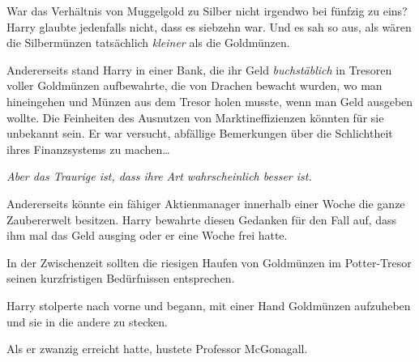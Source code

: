 War das Verhältnis von Muggelgold zu Silber nicht irgendwo bei fünfzig zu eins? Harry glaubte jedenfalls nicht, dass es siebzehn war. Und es sah so aus, als wären die Silbermünzen tatsächlich \emph{kleiner} als die Goldmünzen.

Andererseits stand Harry in einer Bank, die ihr Geld \emph{buchstäblich} in Tresoren voller Goldmünzen aufbewahrte, die von Drachen bewacht wurden, wo man hineingehen und Münzen aus dem Tresor holen musste, wenn man Geld ausgeben wollte. Die Feinheiten des Ausnutzen von Marktineffizienzen könnten für sie unbekannt sein. Er war versucht, abfällige Bemerkungen über die Schlichtheit ihres Finanzsystems zu machen…

\emph{Aber das Traurige ist, dass ihre Art wahrscheinlich besser ist.}

Andererseits könnte ein fähiger Aktienmanager innerhalb einer Woche die ganze Zaubererwelt besitzen. Harry bewahrte diesen Gedanken für den Fall auf, dass ihm mal das Geld ausging oder er eine Woche frei hatte.

In der Zwischenzeit sollten die riesigen Haufen von Goldmünzen im Potter-Tresor seinen kurzfristigen Bedürfnissen entsprechen.

Harry stolperte nach vorne und begann, mit einer Hand Goldmünzen aufzuheben und sie in die andere zu stecken.

Als er zwanzig erreicht hatte, hustete Professor McGonagall.

